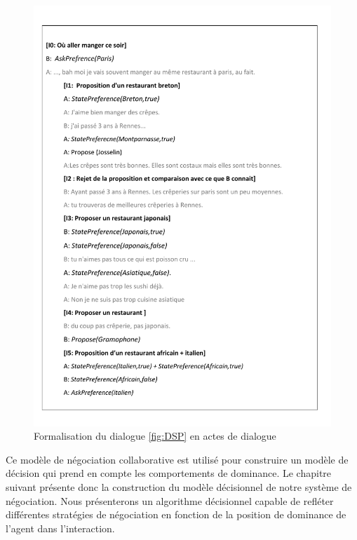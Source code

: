 			\begin{figure}[t]
				\includegraphics[width=\linewidth, height=0.8\textheight]{Figures/natToUtt.pdf}
				\caption{\label{fig:natUtt} Formalisation du dialogue \ref{fig:DSP} en actes de dialogue}
				
			\end{figure} 
			Ce modèle de négociation collaborative est utilisé pour construire un modèle de décision qui prend en compte les comportements de dominance. Le chapitre suivant présente donc la construction du modèle décisionnel de notre système de négociation. Nous présenterons un algorithme décisionnel capable de refléter différentes stratégies de négociation en fonction de la position de dominance de l'agent dans l'interaction.
					
			
	
